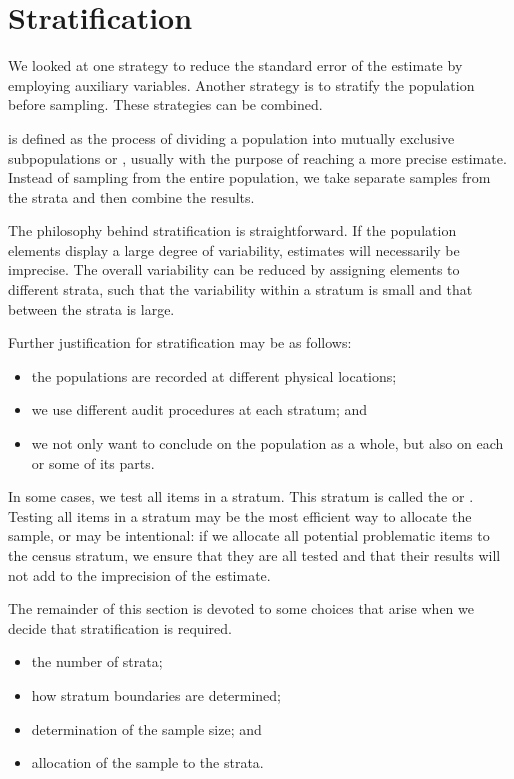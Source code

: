 \section{Stratification} %
\label{sec:stratification}

We looked at one strategy to reduce the standard error of the estimate by employing auxiliary variables. Another strategy is to stratify the population before sampling. These strategies can be combined.

 is defined as the process of dividing a population into mutually exclusive subpopulations or , usually with the purpose of reaching a more precise estimate. Instead of sampling from the entire population, we take separate samples from the strata and then combine the results.

The philosophy behind stratification is straightforward. If the population elements display a large degree of variability, estimates will necessarily be imprecise. The overall variability can be reduced by assigning elements to different strata, such that the variability within a stratum is small and that between the strata is large.

\bigskip
Further justification for stratification may be as follows:
\begin{itemize}
\item the populations are recorded at different physical locations;
\item we use different audit procedures at each stratum; and
\item we not only want to conclude on the population as a whole, but also on each or some of its parts.
\end{itemize}

\bigskip
In some cases, we test all items in a stratum. This stratum is called the  or . 
Testing all items in a stratum may be the most efficient way to allocate the sample, or may be intentional: if we allocate all potential problematic items to the census stratum, we ensure that they are all tested and that their results will not add to the imprecision of the estimate.

\bigskip
The remainder of this section is devoted to some choices that arise when we decide that stratification is required.
\begin{itemize}
\item the number of strata;
\item how stratum boundaries are determined;
\item determination of the sample size; and
\item allocation of the sample to the strata.
\end{itemize}

